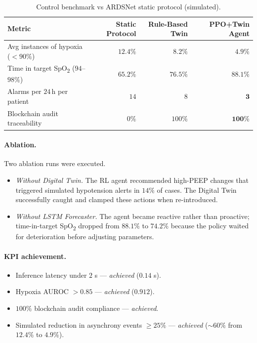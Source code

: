 \documentclass[12pt,a4paper,oneside]{report}
\begin{document}
\begin{table}[h]
\centering
\caption{Control benchmark vs ARDSNet static protocol (simulated).}
\label{tab:ppo}
\begin{tabular}{lrrr}
\toprule
\textbf{Metric} & \textbf{Static Protocol} & \textbf{Rule-Based Twin} & \textbf{PPO+Twin Agent}\\
\midrule
Avg instances of hypoxia ($<90\%$) & $12.4\%$ & $8.2\%$ & $\mathbf{4.9\%}$\\
Time in target SpO\textsubscript{2} ($94$--$98\%$) & $65.2\%$ & $76.5\%$ & $\mathbf{88.1\%}$\\
Alarms per $24$\,h per patient & $14$ & $8$ & $\mathbf{3}$\\
Blockchain audit traceability & $0\%$ & $100\%$ & $\mathbf{100\%}$\\
\bottomrule
\end{tabular}
\end{table}

\paragraph{Ablation.} Two ablation runs were executed.
\begin{itemize}[leftmargin=*]
  \item \emph{Without Digital Twin.} The RL agent recommended high-PEEP changes that triggered simulated hypotension alerts in $14\%$ of cases. The Digital Twin successfully caught and clamped these actions when re-introduced.
  \item \emph{Without LSTM Forecaster.} The agent became reactive rather than proactive; time-in-target SpO\textsubscript{2} dropped from $88.1\%$ to $74.2\%$ because the policy waited for deterioration before adjusting parameters.
\end{itemize}

\paragraph{KPI achievement.}
\begin{itemize}[leftmargin=*]
  \item Inference latency under $2$ s ---  \emph{achieved} ($0.14$ s).
  \item Hypoxia AUROC $> 0.85$ --- \emph{achieved} ($0.912$).
  \item $100\%$ blockchain audit compliance --- \emph{achieved}.
  \item Simulated reduction in asynchrony events $\geq 25\%$ --- \emph{achieved} ($\sim 60\%$ from $12.4\%$ to $4.9\%$).
\end{itemize}
\end{document}
